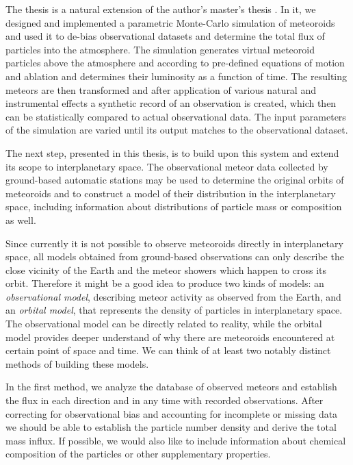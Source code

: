 The thesis is a natural extension of the author's master's thesis \citep{balaz-thesis}.
In it, we designed and implemented a parametric Monte-Carlo simulation of meteoroids
and used it to de-bias observational datasets and determine the total flux
of particles into the atmosphere.
The simulation generates virtual meteoroid particles above the atmosphere and
according to pre-defined equations of motion and ablation and determines their luminosity as a function of time.
The resulting meteors are then transformed and after application of various natural and
instrumental effects a synthetic record of an observation is created,
which then can be statistically compared to actual observational data.
The input parameters of the simulation are varied until its output matches to the observational dataset.

The next step, presented in this thesis, is to build upon this system and extend its scope to interplanetary space.
The observational meteor data collected by ground-based automatic stations may be used
to determine the original orbits of meteoroids and to construct a model
of their distribution in the interplanetary space, including information
about distributions of particle mass or composition as well.

Since currently it is not possible to observe meteoroids directly in interplanetary space,
all models obtained from ground-based observations can only describe the close
vicinity of the Earth and the meteor showers which happen to cross its orbit.
Therefore it might be a good idea to produce two kinds of models: an \emph{observational model},
describing meteor activity as observed from the Earth, and an \emph{orbital model},
that represents the density of particles in interplanetary space.
The observational model can be directly related to reality, while the orbital
model provides deeper understand of why there are meteoroids encountered at
certain point of space and time.
We can think of at least two notably distinct methods of building these models.

In the first method, we analyze the database of observed meteors and establish
the flux in each direction and in any time with recorded observations.
After correcting for observational bias and accounting for incomplete or missing
data we should be able to establish the particle
number density and derive the total mass influx.
If possible, we would also like to include information
about chemical composition of the particles or other supplementary properties.

